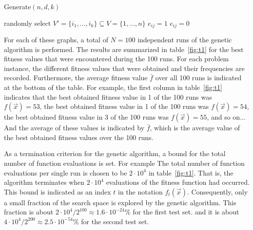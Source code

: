 \documentclass[12pt]{article}
\begin{document}
\begin{algorithm}
\caption{Generate$(n, d, k)$}
\label{alg:gen}
\begin{algorithmic}[1]


\State randomly select $V' = \{i_1, \dots, i_k\} \subseteq V = \{1, \dots, n\}$
\State
{}
\State $e_{ij} = 1$
\Else
\State $e_{ij} = 0$
\EndIf
\EndFor
\EndFor


\end{algorithmic}
\end{algorithm}

For each of these graphs, a total of
$N = 100$ independent runs of the genetic algorithm is performed.
The results are summarized in table~\ref{fig:t1} for the best
fitness values that were encountered during the 100 runs.
For each problem instance, the different fitness values that were
obtained and their frequencies are recorded.
Furthermore, the average fitness value $\bar{f}$ over
all 100 runs is indicated at the bottom of the table.
For example, the first column in table~\ref{fig:t1} indicates
that the best obtained fitness value in 1 of the 100 runs was $f(\vec{x}) = 53$,
the best obtained fitness value in 1 of the 100 runs was $f(\vec{x}) = 54$,
the best obtained fitness value in 3 of the 100 runs was $f(\vec{x}) = 55$, and so on...
And the average of these values is indicated by $\bar{f}$, which is the average value of
the best obtained fitness values over the 100 runs.

As a termination criterion for the genetic algorithm, a bound for the total number of function evaluations is set.
For example The total number of function evaluations per single run is chosen to be $2 \cdot 10^4$ in table~\ref{fig:t1}.
That is, the algorithm terminates when $2 \cdot 10^4$ evaluations of the fitness function
had occurred.
This bound is indicated as an index $t$ in the notation $f_t(\vec{x})$.
Consequently, only a small fraction of the search space is explored by the genetic algorithm.
This fraction is about $ 2 \cdot 10^4 / 2^{100} \approx 1.6 \cdot 10^{-24} \% $ for the first test set.
and it is about $ 4 \cdot 10^4 / 2^{200} \approx 2.5 \cdot 10^{-54} \% $ for the second test set.
\end{document}
